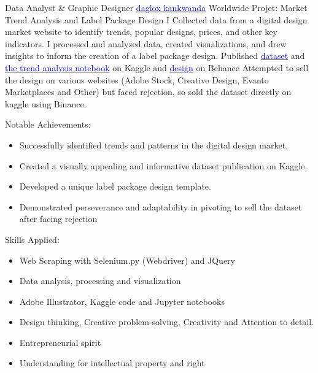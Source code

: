 \vspace{2mm}

    {Data Analyst \& Graphic Designer}
    {\href{https://www.linkedin.com/posts/daglox-kankwanda-59a617182_package-design-dataset-activity-7105563461622870017-fupP?utm_source=share&utm_medium=member_desktop}{\textcolor{blue}{daglox kankwanda}}}
    {Worldwide}
    {
    \newline
    Projet: Market Trend Analysis and Label Package Design
    \newline
    I Collected data from a digital design market website to identify trends, popular designs, prices, and other key indicators.
    I processed and analyzed data, created visualizations, and drew insights to inform the creation of a label package design.
    Published \href{https://www.kaggle.com/datasets/dagloxkankwanda/package-design-dataset}{\textcolor{blue}{dataset}} and 
    \href{https://www.kaggle.com/code/dagloxkankwanda/packaging-design-analysis}{\textcolor{blue}{the trend analysis notebook}} on Kaggle and 
    \href{https://www.behance.net/gallery/179054409/Label-package-design-templlate?tracking_source=search_projects|Daglox&l=0}{\textcolor{blue}{design}} on Behance
    Attempted to sell the design on various websites (Adobe Stock, Creative Design, Evanto Marketplaces and Other) but faced rejection, so sold the dataset directly on kaggle using Binance.
    } 
    {
    \newline
    Notable Achievements:
    \begin{itemize}
        \item Successfully identified trends and patterns in the digital design market.
        \item Created a visually appealing and informative dataset publication on Kaggle.
        \item Developed a unique label package design template.
        \item Demonstrated perseverance and adaptability in pivoting to sell the dataset after facing rejection
    \end{itemize}
    \vspace{1mm}
    Skills Applied:
    \begin{itemize}
        \item Web Scraping with Selenium.py (Webdriver) and JQuery
        \item Data analysis, processing and visualization
        \item Adobe Illustrator, Kaggle code and Jupyter notebooks
        \item Design thinking, Creative problem-solving, Creativity and Attention to detail.
        \item Entrepreneurial spirit
        \item Understanding for intellectual property and right
    \end{itemize}
    }

